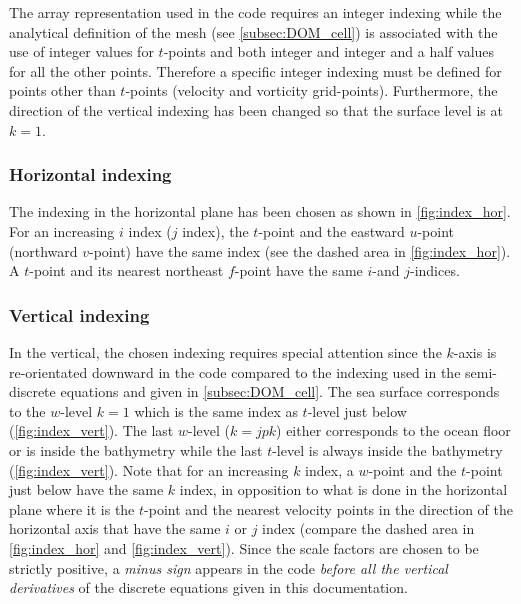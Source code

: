\documentclass[../main/NEMO_manual]{subfiles}
\begin{document}
The array representation used in the \fortran code requires an integer indexing while
the analytical definition of the mesh (see \autoref{subsec:DOM_cell}) is associated with the use of
integer values for $t$-points and both integer and integer and a half values for all the other points.
Therefore a specific integer indexing must be defined for points other than $t$-points
(\ie velocity and vorticity grid-points).
Furthermore, the direction of the vertical indexing has been changed so that the surface level is at $k=1$.

\subsubsection{Horizontal indexing}
\label{subsec:DOM_Num_Index_hor}

The indexing in the horizontal plane has been chosen as shown in \autoref{fig:index_hor}.
For an increasing $i$ index ($j$ index),
the $t$-point and the eastward $u$-point (northward $v$-point) have the same index
(see the dashed area in \autoref{fig:index_hor}).
A $t$-point and its nearest northeast $f$-point have the same $i$-and $j$-indices.

\subsubsection{Vertical indexing}
\label{subsec:DOM_Num_Index_vertical}

In the vertical, the chosen indexing requires special attention since
the $k$-axis is re-orientated downward in the \fortran code compared to
the indexing used in the semi-discrete equations and given in \autoref{subsec:DOM_cell}.
The sea surface corresponds to the $w$-level $k=1$ which is the same index as $t$-level just below
(\autoref{fig:index_vert}).
The last $w$-level ($k=jpk$) either corresponds to the ocean floor or is inside the bathymetry while
the last $t$-level is always inside the bathymetry (\autoref{fig:index_vert}).
Note that for an increasing $k$ index, a $w$-point and the $t$-point just below have the same $k$ index,
in opposition to what is done in the horizontal plane where
it is the $t$-point and the nearest velocity points in the direction of the horizontal axis that
have the same $i$ or $j$ index
(compare the dashed area in \autoref{fig:index_hor} and \autoref{fig:index_vert}).
Since the scale factors are chosen to be strictly positive, a \emph{minus sign} appears in the \fortran 
code \emph{before all the vertical derivatives} of the discrete equations given in this documentation.
\end{document}
